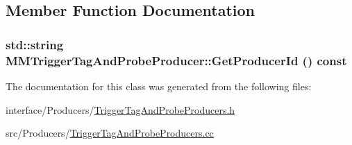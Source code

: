 \subsection{Member Function Documentation}
\hypertarget{classMMTriggerTagAndProbeProducer_ae05d88154ba8fb500a3b089996291225}{
\subsubsection[{GetProducerId}]{\setlength{\rightskip}{0pt plus 5cm}std::string MMTriggerTagAndProbeProducer::GetProducerId () const}}
\label{classMMTriggerTagAndProbeProducer_ae05d88154ba8fb500a3b089996291225}


The documentation for this class was generated from the following files:\begin{DoxyCompactItemize}
\item 
interface/Producers/\hyperlink{TriggerTagAndProbeProducers_8h}{TriggerTagAndProbeProducers.h}\item 
src/Producers/\hyperlink{TriggerTagAndProbeProducers_8cc}{TriggerTagAndProbeProducers.cc}\end{DoxyCompactItemize}
